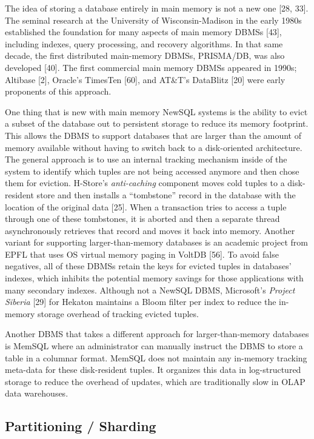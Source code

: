 \documentclass[a4paper,11pt,twoside,openright]{article}
\begin{document}
The idea of storing a database entirely in main memory is not a new one
{[}28, 33{]}. The seminal research at the University of
Wisconsin-Madison in the early 1980s established the foundation for many
aspects of main memory DBMSs {[}43{]}, including indexes, query
processing, and recovery algorithms. In that same decade, the first
distributed main-memory DBMSs, PRISMA/DB, was also developed {[}40{]}.
The first commercial main memory DBMSs appeared in 1990s; Altibase
{[}2{]}, Oracle's TimesTen {[}60{]}, and AT\&T's DataBlitz {[}20{]} were
early proponents of this approach.

One thing that is new with main memory NewSQL systems is the ability to
evict a subset of the database out to persistent storage to reduce its
memory footprint. This allows the DBMS to support databases that are
larger than the amount of memory available without having to switch back
to a disk-oriented architecture. The general approach is to use an
internal tracking mechanism inside of the system to identify which
tuples are not being accessed anymore and then chose them for eviction.
H-Store's \emph{anti-caching} component moves cold tuples to a
disk-resident store and then installs a ``tombstone'' record in the
database with the location of the original data {[}25{]}. When a
transaction tries to access a tuple through one of these tombstones, it
is aborted and then a separate thread asynchronously retrieves that
record and moves it back into memory. Another variant for supporting
larger-than-memory databases is an academic project from EPFL that uses
OS virtual memory paging in VoltDB {[}56{]}. To avoid false negatives,
all of these DBMSs retain the keys for evicted tuples in databases'
indexes, which inhibits the potential memory savings for those
applications with many secondary indexes. Although not a NewSQL DBMS,
Microsoft's \emph{Project Siberia} {[}29{]} for Hekaton maintains a
Bloom filter per index to reduce the in-memory storage overhead of
tracking evicted tuples.

Another DBMS that takes a different approach for larger-than-memory
databases is MemSQL where an administrator can manually instruct the
DBMS to store a table in a columnar format. MemSQL does not maintain any
in-memory tracking meta-data for these disk-resident tuples. It
organizes this data in log-structured storage to reduce the overhead of
updates, which are traditionally slow in OLAP data warehouses.

\hypertarget{partitioning-sharding}{%
\subsection{Partitioning / Sharding}\label{partitioning-sharding}}
\end{document}
